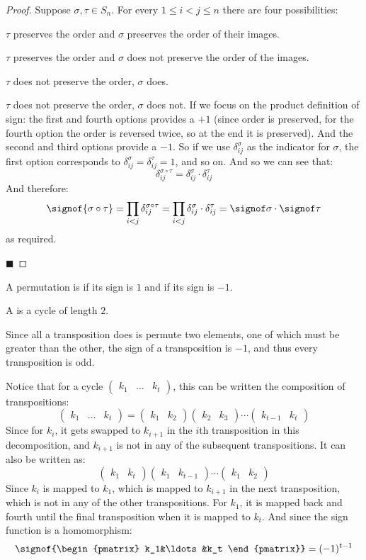 \documentclass[10pt]{article}
\def\pmat#1{\begin{pmatrix} #1 \end{pmatrix}}
\begin{document}
\begin{proof}

    Suppose $\sigma,\tau\in S_n$.
    For every $1\leq i<j\leq n$ there are four possibilities:
    \benum
        \item $\tau$ preserves the order and $\sigma$ preserves the order of their images.
        \item $\tau$ preserves the order and $\sigma$ does not preserve the order of the images.
        \item $\tau$ does not preserve the order, $\sigma$ does.
        \item $\tau$ does not preserve the order, $\sigma$ does not.
    \eenum
    If we focus on the product definition of sign: the first and fourth options provides a $+1$ (since order is preserved, for the fourth option the order is reversed twice, so at the end it is preserved).
    And the second and third options provide a $-1$.
    So if we use $\delta_{ij}^\sigma$ as the indicator for $\sigma$, the first option corresponds to $\delta_{ij}^\sigma=\delta_{ij}^\tau=1$, and so on.
    And so we can see that:
    \[ \delta_{ij}^{\sigma\circ\tau} = \delta_{ij}^\sigma\cdot\delta_{ij}^\tau \]
    And therefore:
    \[ \signof{\sigma\circ\tau} = \prod_{i<j}\delta_{ij}^{\sigma\circ\tau} = \prod_{i<j}\delta_{ij}^\sigma\cdot\delta_{ij}^\tau = \signof\sigma\cdot\signof\tau \]
    as required.

    \hfill$\blacksquare$

\end{proof}

\begin{defn*}

    A permutation is  if its sign is $1$ and  if its sign is $-1$.

\end{defn*}

\begin{defn*}

    A  is a cycle of length $2$.

\end{defn*}

Since all a transposition does is permute two elements, one of which must be greater than the other, the sign of a transposition is $-1$, and thus every transposition is odd.

Notice that for a cycle $\pmat{k_1&\ldots&k_t}$, this can be written the composition of transpositions:
\[ \pmat{k_1&\ldots&k_t} = \pmat{k_1&k_2}\pmat{k_2&k_3}\cdots\pmat{k_{t-1}&k_t} \]
Since for $k_i$, it gets swapped to $k_{i+1}$ in the $i$th transposition in this decomposition, and $k_{i+1}$ is not in any of the subsequent transpositions.
It can also be written as:
\[ \pmat{k_1&k_t}\pmat{k_1&k_{t-1}}\cdots\pmat{k_1&k_2} \]
Since $k_i$ is mapped to $k_1$, which is mapped to $k_{i+1}$ in the next transposition, which is not in any of the other transpositions.
For $k_1$, it is mapped back and fourth until the final transposition when it is mapped to $k_t$.
And since the sign function is a homomorphism:
\[ \signof{\pmat{k_1&\ldots&k_t}} = (-1)^{t-1} \]
\end{document}
